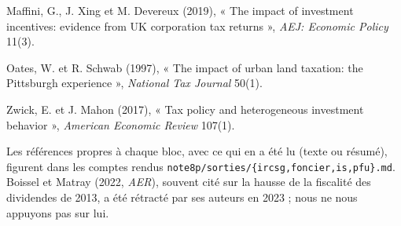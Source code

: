 \documentclass[10pt,a4paper]{article}
\begin{document}
{Maffini, G., J. Xing et M. Devereux (2019), « The impact of investment incentives: evidence from UK corporation tax
returns », \emph{AEJ: Economic Policy} 11(3). \par
Oates, W. et R. Schwab (1997), « The impact of urban land taxation: the Pittsburgh experience », \emph{National Tax
Journal} 50(1). \par
Zwick, E. et J. Mahon (2017), « Tax policy and heterogeneous investment behavior », \emph{American Economic Review}
107(1). \par
Les références propres à chaque bloc, avec ce qui en a été lu (texte ou résumé), figurent dans les comptes rendus
\texttt{note8p/sorties/\{ircsg,foncier,is,pfu\}.md}. Boissel et Matray (2022, \emph{AER}), souvent cité sur la hausse de
la fiscalité des dividendes de 2013, a été rétracté par ses auteurs en 2023 ; nous ne nous appuyons pas sur lui.\par}
\end{document}
